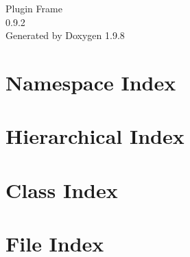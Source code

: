 \documentclass[twoside]{book}
\newcommand{\+}{\discretionary{\mbox{\scriptsize$\hookleftarrow$}}{}{}}
\newcommand{\clearemptydoublepage}{%
    \newpage{\pagestyle{empty}\cleardoublepage}%
  }
\begin{document}
  \raggedbottom
    \hypersetup{pageanchor=false,
                bookmarksnumbered=true,
                pdfencoding=unicode
               }
  \begin{titlepage}
  \vspace*{7cm}
  \begin{center}%
  {\Large Plugin Frame}\\
  [1ex]\large 0.\+9.\+2 \\
  \vspace*{1cm}
  {\large Generated by Doxygen 1.9.8}\\
  \end{center}
  \end{titlepage}
  \clearemptydoublepage
  \tableofcontents
  \clearemptydoublepage
  \hypersetup{pageanchor=true}
\chapter{Namespace Index}

\chapter{Hierarchical Index}

\chapter{Class Index}

\chapter{File Index}

\end{document}
